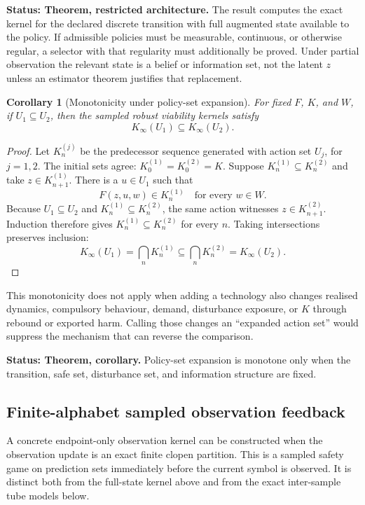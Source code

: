 \documentclass[11pt]{article}
\newtheorem{corollary}{Corollary}
\theoremstyle{definition}
\newcommand{\status}[1]{\par\smallskip\noindent\textbf{Status: #1.}\quad}
\begin{document}
\status{Theorem, restricted architecture} The result computes the exact kernel for the declared discrete transition with full augmented state available to the policy. If admissible policies must be measurable, continuous, or otherwise regular, a selector with that regularity must additionally be proved. Under partial observation the relevant state is a belief or information set, not the latent $z$ unless an estimator theorem justifies that replacement.

\begin{corollary}[Monotonicity under policy-set expansion]
For fixed $F$, $K$, and $W$, if $U_1\subseteq U_2$, then the sampled robust viability kernels satisfy
\[
K_\infty(U_1)\subseteq K_\infty(U_2).
\]
\end{corollary}

\begin{proof}
Let $K_n^{(j)}$ be the predecessor sequence generated with action set $U_j$, for $j=1,2$. The initial sets agree: $K_0^{(1)}=K_0^{(2)}=K$. Suppose $K_n^{(1)}\subseteq K_n^{(2)}$ and take $z\in K_{n+1}^{(1)}$. There is a $u\in U_1$ such that
\[
F(z,u,w)\in K_n^{(1)}\quad\text{for every }w\in W.
\]
Because $U_1\subseteq U_2$ and $K_n^{(1)}\subseteq K_n^{(2)}$, the same action witnesses $z\in K_{n+1}^{(2)}$. Induction therefore gives $K_n^{(1)}\subseteq K_n^{(2)}$ for every $n$. Taking intersections preserves inclusion:
\[
K_\infty(U_1)=\bigcap_nK_n^{(1)}
\subseteq\bigcap_nK_n^{(2)}=K_\infty(U_2).
\]
\end{proof}

This monotonicity does not apply when adding a technology also changes realised dynamics, compulsory behaviour, demand, disturbance exposure, or $K$ through rebound or exported harm. Calling those changes an ``expanded action set'' would suppress the mechanism that can reverse the comparison.

\status{Theorem, corollary} Policy-set expansion is monotone only when the transition, safe set, disturbance set, and information structure are fixed.

\subsection{Finite-alphabet sampled observation feedback}

A concrete endpoint-only observation kernel can be constructed when the observation update is an exact finite clopen partition. This is a sampled safety game on prediction sets immediately before the current symbol is observed. It is distinct both from the full-state kernel above and from the exact inter-sample tube models below.
\end{document}
